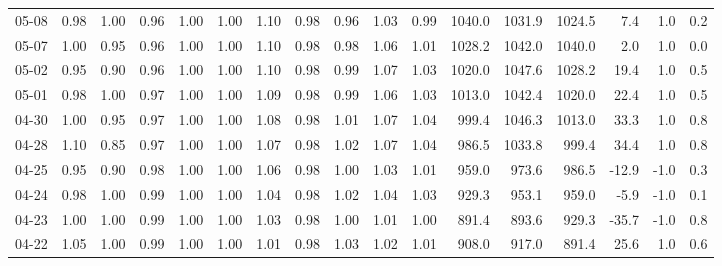 \begin{threeparttable}
{\begin{tabular}{lrrrrrrrrrrrrrrrr}
  05-08 &   0.98 &   1.00 &         0.96 &     1.00 &           1.00 &        1.10 &        0.98 &        0.96 &          1.03 &          0.99 & 1040.0 & 1031.9 & 1024.5 &        7.4 &                      1.0 &                 0.2 \\
  05-07 &   1.00 &   0.95 &         0.96 &     1.00 &           1.00 &        1.10 &        0.98 &        0.98 &          1.06 &          1.01 & 1028.2 & 1042.0 & 1040.0 &        2.0 &                      1.0 &                 0.0 \\
  05-02 &   0.95 &   0.90 &         0.96 &     1.00 &           1.00 &        1.10 &        0.98 &        0.99 &          1.07 &          1.03 & 1020.0 & 1047.6 & 1028.2 &       19.4 &                      1.0 &                 0.5 \\
  05-01 &   0.98 &   1.00 &         0.97 &     1.00 &           1.00 &        1.09 &        0.98 &        0.99 &          1.06 &          1.03 & 1013.0 & 1042.4 & 1020.0 &       22.4 &                      1.0 &                 0.5 \\
  04-30 &   1.00 &   0.95 &         0.97 &     1.00 &           1.00 &        1.08 &        0.98 &        1.01 &          1.07 &          1.04 &  999.4 & 1046.3 & 1013.0 &       33.3 &                      1.0 &                 0.8 \\
  04-28 &   1.10 &   0.85 &         0.97 &     1.00 &           1.00 &        1.07 &        0.98 &        1.02 &          1.07 &          1.04 &  986.5 & 1033.8 &  999.4 &       34.4 &                      1.0 &                 0.8 \\
  04-25 &   0.95 &   0.90 &         0.98 &     1.00 &           1.00 &        1.06 &        0.98 &        1.00 &          1.03 &          1.01 &  959.0 &  973.6 &  986.5 &      -12.9 &                     -1.0 &                 0.3 \\
  04-24 &   0.98 &   1.00 &         0.99 &     1.00 &           1.00 &        1.04 &        0.98 &        1.02 &          1.04 &          1.03 &  929.3 &  953.1 &  959.0 &       -5.9 &                     -1.0 &                 0.1 \\
  04-23 &   1.00 &   1.00 &         0.99 &     1.00 &           1.00 &        1.03 &        0.98 &        1.00 &          1.01 &          1.00 &  891.4 &  893.6 &  929.3 &      -35.7 &                     -1.0 &                 0.8 \\
  04-22 &   1.05 &   1.00 &         0.99 &     1.00 &           1.00 &        1.01 &        0.98 &        1.03 &          1.02 &          1.01 &  908.0 &  917.0 &  891.4 &       25.6 &                      1.0 &                 0.6 \\

\end{tabular}}
\end{threeparttable}
